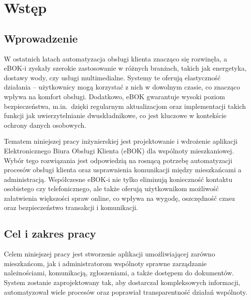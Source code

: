 \chapter{Wstęp}
\section{Wprowadzenie}
W ostatnich latach automatyzacja obsługi klienta znacząco się rozwinęła, a eBOK-i zyskały szerokie zastosowanie w różnych branżach, takich jak energetyka, dostawy wody, czy usługi multimedialne. Systemy te oferują elastyczność działania – użytkownicy mogą korzystać z nich w dowolnym czasie, co znacząco wpływa na komfort obsługi. Dodatkowo, eBOK gwarantuje wysoki poziom bezpieczeństwa, m.in.\ dzięki regularnym aktualizacjom oraz implementacji takich funkcji jak uwierzytelnianie dwuskładnikowe, co jest kluczowe w kontekście ochrony danych osobowych.


Tematem niniejszej pracy inżynierskiej jest projektowanie i wdrożenie aplikacji Elektronicznego Biura Obsługi Klienta (eBOK) dla wspólnoty mieszkaniowej. Wybór tego rozwiązania jest odpowiedzią na rosnącą potrzebę automatyzacji procesów obsługi klienta oraz usprawnienia komunikacji między mieszkańcami a administracją. Współczesne eBOK-i nie tylko eliminują konieczność kontaktu osobistego czy telefonicznego, ale także oferują użytkownikom możliwość załatwienia większości spraw online, co wpływa na wygodę, oszczędność czasu oraz bezpieczeństwo transakcji i komunikacji.


\section{Cel i zakres pracy}
Celem niniejszej pracy jest stworzenie aplikacji umożliwiającej zarówno mieszkańcom, jak i administratorom wspólnoty sprawne zarządzanie należnościami, komunikacją, zgłoszeniami, a także dostępem do dokumentów. System zostanie zaprojektowany tak, aby dostarczał kompleksowych informacji, automatyzował wiele procesów oraz poprawiał transparentność działań wspólnoty.

